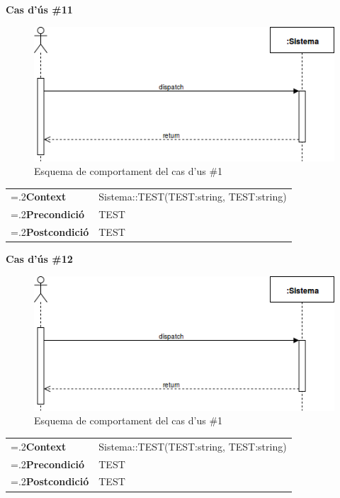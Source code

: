 \clearpage
\noindent\textbf{\large Cas d'ús \#11}\\
\begin{figure}[H]
\centering
\includegraphics[scale=0.6]{Figures/casdus_00.png}
\caption{Esquema de comportament del cas d'us \#1}
\end{figure}
\begin{table}[h]
\noindent
\begin{tabularx}{\linewidth}{
>{\hsize=.2\hsize}X%
>{\hsize=0.8\hsize}X%
}
\textbf{Context} 		& Sistema::TEST(TEST:string, TEST:string) \\
\textbf{Precondició} 	& TEST \\
\textbf{Postcondició}	& TEST \\
\end{tabularx}
\label{}
\end{table}

\noindent\textbf{\large Cas d'ús \#12}\\
\begin{figure}[H]
\centering
\includegraphics[scale=0.6]{Figures/casdus_00.png}
\caption{Esquema de comportament del cas d'us \#1}
\end{figure}
\begin{table}[h]
\noindent
\begin{tabularx}{\linewidth}{
>{\hsize=.2\hsize}X%
>{\hsize=0.8\hsize}X%
}
\textbf{Context} 		& Sistema::TEST(TEST:string, TEST:string) \\
\textbf{Precondició} 	& TEST \\
\textbf{Postcondició}	& TEST \\
\end{tabularx}
\label{}
\end{table}

